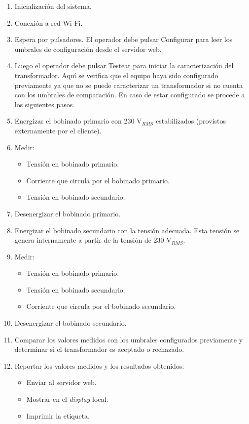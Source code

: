 \begin{enumerate}
\item Inicialización del sistema.
\item Conexión a red Wi-Fi.
\item Espera por pulsadores. El operador debe pulsar Configurar para leer los umbrales de configuración desde el servidor web.
\item Luego el operador debe pulsar Testear para iniciar la caracterización del transformador. Aquí se verifica que el equipo haya sido configurado previamente ya que no se puede caracterizar un transformador si no cuenta con los umbrales de comparación. En caso de estar configurado se procede a los siguientes pasos.
\item Energizar el bobinado primario con 230 V$_{RMS}$ estabilizados (provistos externamente por el cliente).
\item Medir:
\begin{itemize}
	\item Tensión en bobinado primario.
	\item Corriente que circula por el bobinado primario.
	\item Tensión en bobinado secundario.
\end{itemize}
\item Desenergizar el bobinado primario.
\item Energizar el bobinado secundario con la tensión adecuada. Esta tensión se genera internamente a partir de la tensión de 230 V$_{RMS}$.
\item Medir:
\begin{itemize}
	\item Tensión en bobinado primario.
	\item Tensión en bobinado secundario.
	\item Corriente que circula por el bobinado secundario.
\end{itemize}
\item Desenergizar el bobinado secundario.
\item Comparar los valores medidos con los umbrales configurados previamente y determinar si el transformador es aceptado o rechazado.
\item Reportar los valores medidos y los resultados obtenidos:
\begin{itemize}
	\item Enviar al servidor web.
	\item Mostrar en el \textit{display} local.
	\item Imprimir la etiqueta.
\end{itemize}
\end{enumerate}


